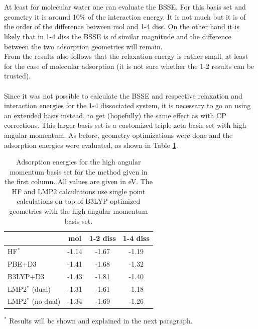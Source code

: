 \documentclass[11pt,DIV=13,BCOR=5mm,a4paper,headinclude]{scrbook}
\begin{document}
\\
\\
At least for molecular water one can evaluate the BSSE.
For this basis set and geometry it is around 10$\%$ of the interaction
energy.
It is not much but it is of the order of the difference between mol and 1-4 diss.
On the other hand it is likely that in 1-4 diss the BSSE is of similar magnitude and the difference between the two adsorption geometries will remain.
\\
From the results also follows that the relaxation energy is rather small, at least for the case of molecular adsorption (it is not sure whether the 1-2 results can be trusted).
\\\\
Since it was not possible to calculate the BSSE and respective relaxation and interaction energies for the 1-4 dissociated system, it is necessary to go on using an extended basis instead, to get (hopefully) the same effect as with CP corrections.
This larger basis set is a customized triple zeta basis set with high angular momentum.
As before, geometry optimizations were done and the adsorption energies were evaluated, as shown in Table \ref{tab:combined_results}.
\begin{table}[!h]
  \centering
   \caption{Adsorption energies for the high angular momentum basis set for the method given in the first column.
All values are given in eV. The HF and LMP2 calculations use single point calculations on top of B3LYP optimized geometries with the high angular momentum basis set.}
  \begin{tabular}{l|ccc}
  \toprule
   &mol & 1-2 diss & 1-4 diss \\\midrule
HF$^\ast$ &-1.14 & -1.67 & -1.19\\
PBE+D3 & -1.41 & -1.68 & -1.32 \\
B3LYP+D3 & -1.43 & -1.81 & -1.40 \\
LMP2$^\ast$ (dual) & -1.31 & -1.61 & -1.18 \\ %
LMP2$^\ast$ (no dual) & -1.34 & -1.69 & -1.26\\\bottomrule
  \end{tabular}
  \begin{tablenotes}
 \footnotesize
\item[] $^\ast$ Results will be shown and explained in the next paragraph.
  \end{tablenotes}
  \label{tab:combined_results}
\end{table}
\\
\end{document}
